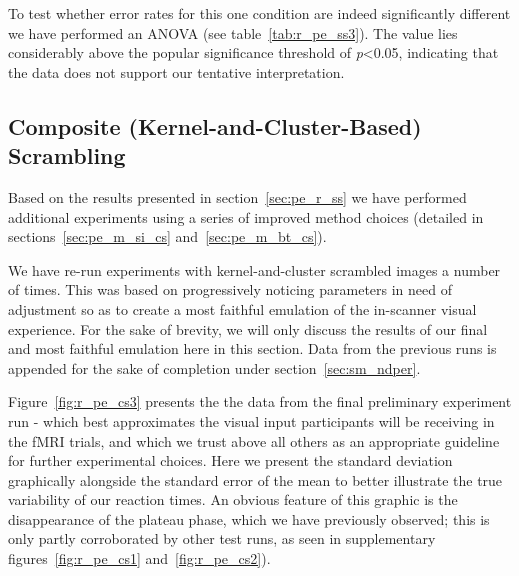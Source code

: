 	    	    
	    To test whether error rates for this one condition are indeed significantly different we have performed an ANOVA (see table~\ref{tab:r_pe_ss3}).
	    The value lies considerably above the popular significance threshold of \textit{p}<0.05, indicating that the data does not support our tentative interpretation.

	\subsection{Composite (Kernel-and-Cluster-Based) Scrambling}\label{sec:pe_r_cs}
	    Based on the results presented in section~\ref{sec:pe_r_ss} we have performed additional experiments using a series of improved method choices (detailed in sections~\ref{sec:pe_m_si_cs} and~\ref{sec:pe_m_bt_cs}).
	    
	    We have re-run experiments with kernel-and-cluster scrambled images a number of times.
	    This was based on progressively noticing parameters in need of adjustment so as to create a most faithful emulation of the in-scanner visual experience.
	    For the sake of brevity, we will only discuss the results of our final and most faithful emulation here in this section.
	    Data from the previous runs is appended for the sake of completion under section~\ref{sec:sm_ndper}.
	     
	    
	    Figure~\ref{fig:r_pe_cs3} presents the the data from the final preliminary experiment run - which best approximates the visual input participants will be receiving in the fMRI trials, and which we trust above all others as an appropriate guideline for further experimental choices.
	    Here we present the standard deviation graphically alongside the standard error of the mean to better illustrate the true variability of our reaction times.
	    An obvious feature of this graphic is the disappearance of the plateau phase, which we have previously observed; this is only partly corroborated by other test runs, as seen in supplementary figures~\ref{fig:r_pe_cs1} and~\ref{fig:r_pe_cs2}).
	    

